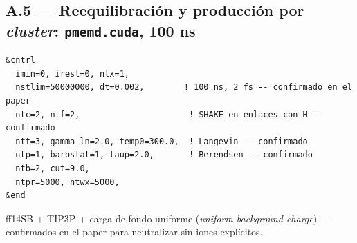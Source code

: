 \documentclass[11pt]{article}
\begin{document}
\subsection*{A.5 --- Reequilibración y producción por \textit{cluster}: \texttt{pmemd.cuda}, 100 ns}
{\footnotesize\begin{verbatim}
&cntrl
  imin=0, irest=0, ntx=1,
  nstlim=50000000, dt=0.002,        ! 100 ns, 2 fs -- confirmado en el paper
  ntc=2, ntf=2,                      ! SHAKE en enlaces con H -- confirmado
  ntt=3, gamma_ln=2.0, temp0=300.0,  ! Langevin -- confirmado
  ntp=1, barostat=1, taup=2.0,       ! Berendsen -- confirmado
  ntb=2, cut=9.0,
  ntpr=5000, ntwx=5000,
&end
\end{verbatim}}

\centering\small\color{migris} ff14SB + TIP3P + carga de fondo uniforme (\textit{uniform background charge}) --- confirmados en el paper para neutralizar sin iones explícitos.
\end{document}

